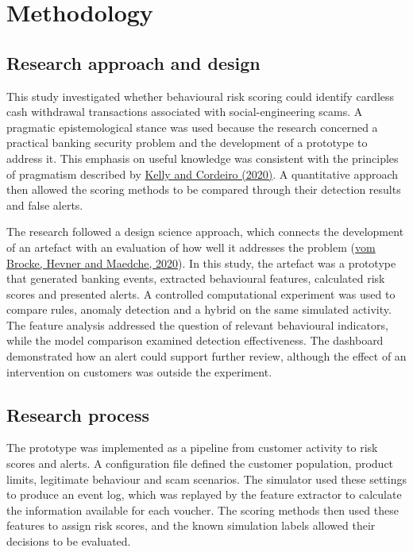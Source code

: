\documentclass[11pt,a4paper]{article}
\begin{document}
\setcounter{section}{4}

\section{Methodology}

\subsection{Research approach and design}

This study investigated whether behavioural risk scoring could identify cardless cash withdrawal transactions associated with social-engineering scams. A pragmatic epistemological stance was used because the research concerned a practical banking security problem and the development of a prototype to address it. This emphasis on useful knowledge was consistent with the principles of pragmatism described by \href{https://doi.org/10.1177/2059799120937242}{Kelly and Cordeiro (2020)}. A quantitative approach then allowed the scoring methods to be compared through their detection results and false alerts.

The research followed a design science approach, which connects the development of an artefact with an evaluation of how well it addresses the problem (\href{https://doi.org/10.1007/978-3-030-46781-4_1}{vom Brocke, Hevner and Maedche, 2020}). In this study, the artefact was a prototype that generated banking events, extracted behavioural features, calculated risk scores and presented alerts. A controlled computational experiment was used to compare rules, anomaly detection and a hybrid on the same simulated activity. The feature analysis addressed the question of relevant behavioural indicators, while the model comparison examined detection effectiveness. The dashboard demonstrated how an alert could support further review, although the effect of an intervention on customers was outside the experiment.

\subsection{Research process}

The prototype was implemented as a pipeline from customer activity to risk scores and alerts. A configuration file defined the customer population, product limits, legitimate behaviour and scam scenarios. The simulator used these settings to produce an event log, which was replayed by the feature extractor to calculate the information available for each voucher. The scoring methods then used these features to assign risk scores, and the known simulation labels allowed their decisions to be evaluated.
\end{document}
